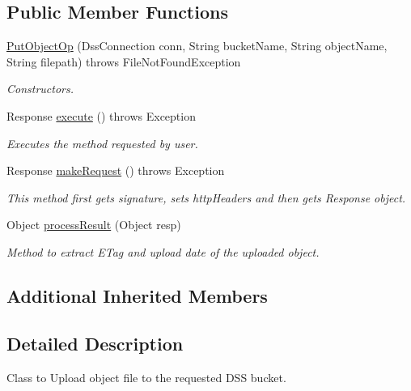 \subsection*{Public Member Functions}
\begin{DoxyCompactItemize}
\item 
\hyperlink{classorg_1_1jcs_1_1dss_1_1op_1_1PutObjectOp_abf3a9721db6ecb0329c028cb0bebdf8d}{Put\+Object\+Op} (Dss\+Connection conn, String bucket\+Name, String object\+Name, String filepath)  throws File\+Not\+Found\+Exception \hypertarget{classorg_1_1jcs_1_1dss_1_1op_1_1PutObjectOp_abf3a9721db6ecb0329c028cb0bebdf8d}{}\label{classorg_1_1jcs_1_1dss_1_1op_1_1PutObjectOp_abf3a9721db6ecb0329c028cb0bebdf8d}

\begin{DoxyCompactList}\small\item\em Constructors. \end{DoxyCompactList}\item 
Response \hyperlink{classorg_1_1jcs_1_1dss_1_1op_1_1PutObjectOp_a4858bcd90c98e27c0f123748b09bfee6}{execute} ()  throws Exception 
\begin{DoxyCompactList}\small\item\em Executes the method requested by user. \end{DoxyCompactList}\item 
Response \hyperlink{classorg_1_1jcs_1_1dss_1_1op_1_1PutObjectOp_a9f6ab4853d789ba25fe00c1a1a856d40}{make\+Request} ()  throws Exception 
\begin{DoxyCompactList}\small\item\em This method first gets signature, sets http\+Headers and then gets Response object. \end{DoxyCompactList}\item 
Object \hyperlink{classorg_1_1jcs_1_1dss_1_1op_1_1PutObjectOp_a54313a9bfbfe99696c87a5671771712d}{process\+Result} (Object resp)
\begin{DoxyCompactList}\small\item\em Method to extract E\+Tag and upload date of the uploaded object. \end{DoxyCompactList}\end{DoxyCompactItemize}
\subsection*{Additional Inherited Members}


\subsection{Detailed Description}
Class to Upload object file to the requested D\+SS bucket. 

